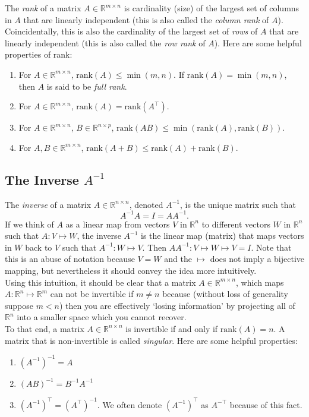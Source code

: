 \documentclass{article}
\newcommand{\1}{\mathbf{1}}
\newcommand{\0}{\mathbf{0}}
\newcommand{\RR}{\mathbb{R}}
\newcommand{\T}{\top}
\newcommand{\rank}{\mathrm{rank}}
\begin{document}
The \textit{rank} of a matrix $A\in\RR^{m\times n}$ is cardinality (size) of the largest set of
columns in $A$ that are linearly independent (this is also called the \textit{column rank} of $A$).
Coincidentally, this is also the cardinality of the largest set of \textit{rows} of $A$ that are 
linearly independent (this is also called the \textit{row rank} of $A$). Here are some helpful
properties of rank:
\begin{enumerate}
\item For $A\in\RR^{m\times n}$, $\rank(A)\leq\min(m,n)$. If $\rank(A)=\min(m,n)$, then $A$
    is said to be \textit{full rank}.
\item For $A\in\RR^{m\times n}$, $\rank(A) = \rank(A^\T)$.
\item For $A\in\RR^{m\times n}$, $B\in\RR^{n\times p}$, $\rank(AB)\leq \min(\rank(A),\rank(B))$.
\item For $A,B\in\RR^{m\times n}$, $\rank(A+B)\leq \rank(A) + \rank(B)$.
\end{enumerate}

\subsection{The Inverse $A^{-1}$}

The \textit{inverse} of a matrix $A\in\RR^{n\times n}$, denoted $A^{-1}$, is the unique matrix
such that
\[
    A^{-1}A = I = AA^{-1}.
\]
If we think of $A$ as a linear map from vectors $V$ in $\RR^n$ to different vectors $W$ in $\RR^n$
such that $A : V \mapsto W$, the inverse $A^{-1}$ is the linear map (matrix) that maps vectors in
$W$ back to $V$ such that $A^{-1}: W \mapsto V$. Then $AA^{-1}:V\mapsto W\mapsto V = I$.
Note that this is an abuse of notation because
$V=W$ and the $\mapsto$ does not imply a bijective mapping, but nevertheless it should convey the
idea more intuitively.\\

Using this intuition, it should be clear that a matrix $A\in\RR^{m\times n}$, which maps $A: \RR^n
\mapsto \RR^m$ can not be invertible if $m\neq n$ because (without loss of generality suppose $m < n$)
then you are effectively `losing information' by projecting all of $\RR^n$ into a smaller space which
you cannot recover.\\

To that end, a matrix $A\in\RR^{n\times n}$ is invertible if and only if $\rank(A) = n$. A matrix that
is non-invertible is called \textit{singular}. Here are some helpful properties:
\begin{enumerate}
\item $(A^{-1})^{-1} = A$
\item $(AB)^{-1} = B^{-1}A^{-1}$
\item $(A^{-1})^\T = (A^\T)^{-1}$. We often denote $(A^{-1})^\T$ as $A^{-\T}$ because
    of this fact.\\
\end{enumerate}
\end{document}
